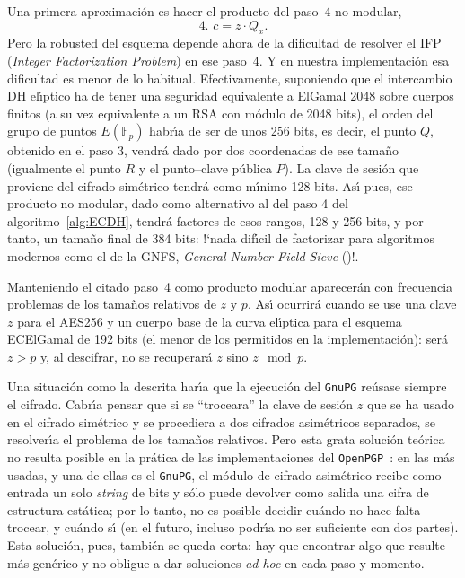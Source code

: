 \documentclass{cedi}%
\def\ce{curva{} el\'{\i}ptica}%
\newcommand{\Fp}{\ensuremath{\mathbb{F}_p}}%
\theoremstyle{plain}        			%
\theoremstyle{definition}   			%
\theoremstyle{saltolinea}   			%
\begin{document}
Una primera aproximaci\'on es hacer el producto del paso~4 no modular,
$$\text{4. }c=z\cdot Q_x.$$
Pero la robusted del esquema depende ahora de la dificultad de resolver el IFP (\emph{Integer Factorization Problem}) en ese paso~4. Y en nuestra implementaci\'on esa dificultad es menor de lo habitual. Efectivamente, suponiendo que el intercambio DH el\'{\i}ptico ha de tener una seguridad equivalente a ElGamal 2048 sobre cuerpos finitos (a su vez equivalente a un RSA con m\'odulo de 2048 bits), el orden del grupo de puntos $E(\Fp)$ habr\'{\i}a de ser de unos 256 bits, es decir, el punto $Q$, obtenido en el paso 3, vendr\'a dado por dos coordenadas de ese tama\~no (igualmente el punto $R$ y el punto--clave p\'ublica $P$). La clave de sesi\'on que proviene del cifrado sim\'etrico tendr\'a como m\'{\i}nimo 128 bits. As\'{\i} pues, ese producto no modular, dado como alternativo al del paso 4 del algoritmo~\ref{alg:ECDH}, tendr\'a factores de esos rangos, 128 y 256 bits, y por tanto, un tama\~no final de 384 bits: !`nada dif\'{\i}cil de factorizar para algoritmos modernos como el de la GNFS, \emph{General Number Field Sieve} (\cite{bbfk:rsa640GNFS})!.

Manteniendo el citado paso~4 como producto modular aparecer\'an con frecuencia problemas de los tama\~nos relativos de $z$ y $p$. As\'{\i} ocurrir\'a cuando se use una clave $z$ para el AES256 y un cuerpo base de la \ce{} para el esquema ECElGamal de 192 bits (el menor de los permitidos en la implementaci\'on): ser\'a $z>p$ y, al descifrar, no se recuperar\'a $z$ sino $z \mod p$.

Una situaci\'on como la descrita har\'{\i}a que la ejecuci\'on del \texttt{GnuPG} re\'usase siempre el cifrado. Cabr\'{\i}a pensar que si se ``troceara'' la clave de sesi\'on $z$ que se ha usado en el cifrado sim\'etrico y se procediera a dos cifrados asim\'etricos separados, se resolver\'{\i}a el problema de los tama\~nos relativos. Pero esta grata soluci\'on te\'orica no resulta posible en la pr\'atica de las implementaciones del \texttt{OpenPGP}~\cite{OPGP}: en las m\'as usadas, y una de ellas es el \texttt{GnuPG}, el m\'odulo de cifrado asim\'etrico recibe como entrada un solo \emph{string} de bits y s\'olo puede devolver como salida una cifra de estructura est\'atica; por lo tanto, no es posible decidir cu\'ando no hace falta trocear, y cu\'ando s\'{\i} (en el futuro, incluso podr\'{\i}a no ser suficiente con dos partes). Esta soluci\'on, pues, tambi\'en se queda corta: hay que encontrar algo que resulte m\'as gen\'erico y no obligue a dar soluciones \emph{ad hoc} en cada paso y momento.
\end{document}
